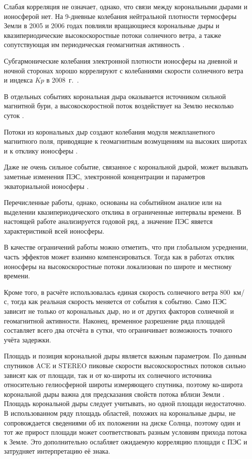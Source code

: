 \documentclass{article}
\begin{document}
Слабая корреляция не означает, однако, что связи между корональными дырами
и ионосферой нет. На 9-дневные колебания нейтральной плотности термосферы Земли в 2005 и 2006
годах повлияли вращающиеся корональные дыры и квазипериодические высокоскоростные
потоки солнечного ветра, а также сопутствующая им периодическая геомагнитная активность \citep{fang2012recurrent}.


Субгармонические колебания электронной плотности ионосферы на дневной и
ночной сторонах хорошо коррелируют с колебаниями скорости солнечного ветра
и индекса $Kp$ в 2008~г.\ \citep{tulasiram2010periodic}.

В отдельных событиях
корональная дыра оказывается источником сильной магнитной бури, а
высокоскоростной поток воздействует на Землю несколько суток
\citep{shimeis2012signature}.

Потоки из корональных дыр создают колебания
модуля межпланетного магнитного поля, приводящие к геомагнитным возмущениям
на высоких широтах и к отклику ионосферы \citep{liu2019analyzing}.

Даже не очень сильное событие, связанное с корональной дырой, может вызывать заметные
изменения ПЭС, электронной концентрации и параметров экваториальной
ионосферы \citep{younas2022ionospheric}.


Перечисленные работы, однако, основаны на событийном анализе или на
выделении квазипериодического отклика в ограниченные интервалы времени.
В настоящей работе анализируется годовой ряд, а значение ПЭС явяется характеристикой
всей ионосферы.

В качестве ограничений работы можно отметить, что при глобальном усреднении,
часть эффектов может взаимно
компенсироваться. Тогда как в работах \citep{liu2019analyzing,tulasiram2010periodic} отклик ионосферы на высокоскоростные потоки локализован
по широте и местному времени.


Кроме того, в расчёте использовалась единая скорость
солнечного ветра 800~км/с, тогда как реальная скорость меняется от события
к событию. Само ПЭС зависит не только от корональных дыр, но и от других
факторов солнечной и геомагнитной активности. Наконец, временное разрешение
ряда площадей составляет всего два отсчёта в сутки, что ограничивает
возможность точного учёта задержки.

Площадь и позиция корональной дыры является важным параметром. По данным спутников
ACE и STEREO пиковые скорости высокоскоростных потоков сильно зависят как
от площади, так и от ко-широты их солнечного источника относительно
гелиосферной широты измеряющего спутника, поэтому ко-широта корональной
дыры важна для предсказания свойств потока вблизи Земли
\citep{hofmeister2018dependence}. Площадь корональной дыры
следует учитывать, но одной площади недостаточно.
В использованном ряду площадь областей, похожих на корональные дыры,
не сопровождается сведениями об их положении на диске Солнца, поэтому один
и тот же прирост площади может соответствовать разным условиям прихода
потока к Земле. Это дополнительно ослабляет ожидаемую корреляцию площади
с ПЭС и затрудняет интерпретацию её знака.
\end{document}
